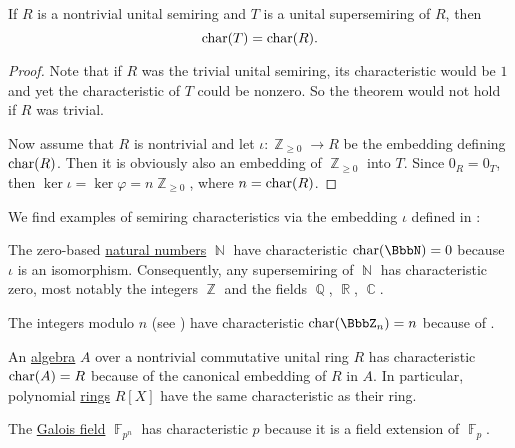 \begin{proposition}\label{thm:embedding_preserves_characteristic}
  If \( R \) is a nontrivial unital semiring and \( T \) is a unital supersemiring of \( R \), then
  \begin{equation*}
    \operatorname{char}(T) = \operatorname{char}(R).
  \end{equation*}
\end{proposition}
\begin{proof}
  Note that if \( R \) was the trivial unital semiring, its characteristic would be \( 1 \) and yet the characteristic of \( T \) could be nonzero. So the theorem would not hold if \( R \) was trivial.

  Now assume that \( R \) is nontrivial and let \( \iota: \BbbZ_{\geq 0} \to R \) be the embedding defining \( \operatorname{char}(R) \). Then it is obviously also an embedding of \( \BbbZ_{\geq 0} \) into \( T \). Since \( 0_R = 0_T \), then \( \ker \iota = \ker \varphi = n\BbbZ_{\geq 0} \), where \( n = \operatorname{char}(R) \).
\end{proof}

\begin{example}\label{ex:semiring_characteristic}
  We find examples of semiring characteristics via the embedding \( \iota \) defined in :

  \begin{thmenum}
     The zero-based \hyperref[def:set_of_natural_numbers]{natural numbers} \( \BbbN \) have characteristic \( \op{char}(\BbbN) = 0 \) because \( \iota \) is an isomorphism. Consequently, any supersemiring of \( \BbbN \) has characteristic zero, most notably the integers \( \BbbZ \) and the fields \( \BbbQ \), \( \BbbR \), \( \BbbC \).

     The integers modulo \( n \) (see ) have characteristic \( \op{char}(\BbbZ_n) = n \) because of .

     An \hyperref[def:algebra_over_ring]{algebra} \( A \) over a nontrivial commutative unital ring \( R \) has characteristic \( \operatorname{char}(A) = R \) because of the canonical embedding of \( R \) in \( A \). In particular, polynomial \hyperref[def:algebra_of_polynomials]{rings} \( R[X] \) have the same characteristic as their ring.

     The \hyperref[thm:galois_field_existence]{Galois field} \( \BbbF_{p^n} \) has characteristic \( p \) because it is a field extension of \( \BbbF_p \).
  \end{thmenum}
\end{example}


